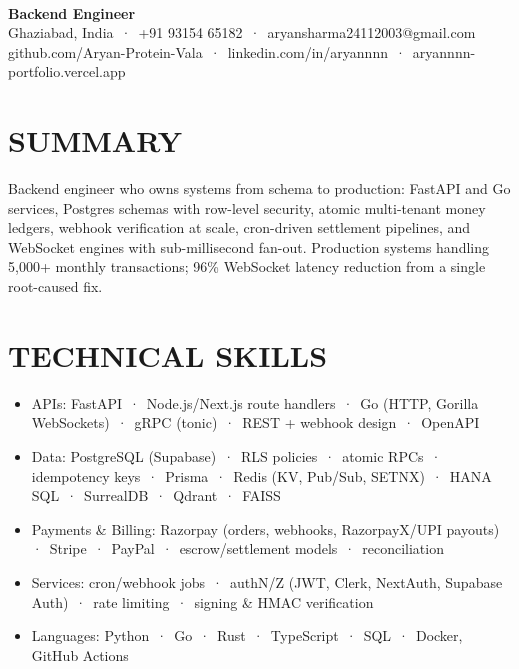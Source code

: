 \documentclass[9pt]{article}
\begin{document}
\\[3pt]
{\large\bfseries Backend Engineer}\\[3pt]
{\small\color{greyc} Ghaziabad, India \,·\, +91 93154 65182 \,·\, aryansharma24112003@gmail.com}\vspace{-2pt}
{\small\color{greyc} github.com/Aryan-Protein-Vala \,·\, linkedin.com/in/aryannnn \,·\, aryannnn-portfolio.vercel.app}\vspace{-2pt}
\section*{SUMMARY}
Backend engineer who owns systems from schema to production: FastAPI and Go services, Postgres schemas with row-level security, atomic multi-tenant money ledgers, webhook verification at scale, cron-driven settlement pipelines, and WebSocket engines with sub-millisecond fan-out. Production systems handling 5,000+ monthly transactions; 96\% WebSocket latency reduction from a single root-caused fix.
\vspace{1pt}
\section*{TECHNICAL SKILLS}
\begin{itemize}[leftmargin=11pt,itemsep=0pt,topsep=1pt,parsep=0pt]
\item APIs: FastAPI \,·\, Node.js/Next.js route handlers \,·\, Go (HTTP, Gorilla WebSockets) \,·\, gRPC (tonic) \,·\, REST + webhook design \,·\, OpenAPI
\item Data: PostgreSQL (Supabase) \,·\, RLS policies \,·\, atomic RPCs \,·\, idempotency keys \,·\, Prisma \,·\, Redis (KV, Pub/Sub, SETNX) \,·\, HANA SQL \,·\, SurrealDB \,·\, Qdrant \,·\, FAISS
\item Payments \& Billing: Razorpay (orders, webhooks, RazorpayX/UPI payouts) \,·\, Stripe \,·\, PayPal \,·\, escrow/settlement models \,·\, reconciliation
\item Services: cron/webhook jobs \,·\, authN/Z (JWT, Clerk, NextAuth, Supabase Auth) \,·\, rate limiting \,·\, signing \& HMAC verification
\item Languages: Python \,·\, Go \,·\, Rust \,·\, TypeScript \,·\, SQL \,·\, Docker, GitHub Actions
\end{itemize}
\end{document}
